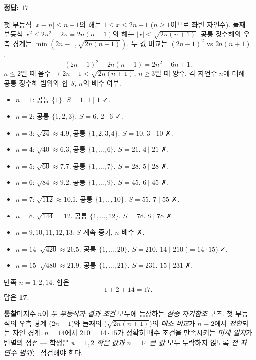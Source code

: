 \documentclass[10pt]{article}
\newcommand{\solnote}[1]{\par\smallskip\noindent
  \begin{tcolorbox}[enhanced, breakable, colback=vB-light, colframe=vB-light,
    boxrule=0pt, arc=3pt, left=10pt, right=10pt, top=4pt, bottom=4pt,
    fontupper=\sffamily\footnotesize\color{vB-ink}]
    \textbf{\color{vB-deep}통찰}\quad #1
  \end{tcolorbox}}
\begin{document}
\begin{answerbox}\sffamily\bfseries 정답: $17$\end{answerbox}
 첫 부등식 $|x - n| \le n - 1$의 해는 $1 \le x \le 2n - 1$ ($n \ge 1$이므로 좌변 자연수).
 둘째 부등식 $x^2 \le 2n^2 + 2n = 2n(n + 1)$의 해는 $|x| \le \sqrt{2n(n + 1)}$.
 공통 정수해의 우측 경계는 $\min(2n - 1, \sqrt{2n(n + 1)})$. 두 값 비교는 $(2n - 1)^2$ vs $2n(n + 1)$.
\[ (2n - 1)^2 - 2n(n + 1) = 2n^2 - 6n + 1. \]
$n \le 2$일 때 음수 → $2n - 1 < \sqrt{2n(n+1)}$, $n \ge 3$일 때 양수.
 각 자연수 $n$에 대해 공통 정수해 범위와 합 $S$, $n$의 배수 여부.
\begin{itemize}\setlength{\itemsep}{0pt}
\item $n = 1$: 공통 $\{1\}$. $S = 1$. $1 \mid 1$ ✓.
\item $n = 2$: 공통 $\{1, 2, 3\}$. $S = 6$. $2 \mid 6$ ✓.
\item $n = 3$: $\sqrt{24} \approx 4.9$, 공통 $\{1, 2, 3, 4\}$. $S = 10$. $3 \mid 10$ ✗.
\item $n = 4$: $\sqrt{40} \approx 6.3$, 공통 $\{1, \ldots, 6\}$. $S = 21$. $4 \mid 21$ ✗.
\item $n = 5$: $\sqrt{60} \approx 7.7$. 공통 $\{1, \ldots, 7\}$. $S = 28$. $5 \mid 28$ ✗.
\item $n = 6$: $\sqrt{84} \approx 9.2$. 공통 $\{1, \ldots, 9\}$. $S = 45$. $6 \mid 45$ ✗.
\item $n = 7$: $\sqrt{112} \approx 10.6$. 공통 $\{1, \ldots, 10\}$. $S = 55$. $7 \mid 55$ ✗.
\item $n = 8$: $\sqrt{144} = 12$. 공통 $\{1, \ldots, 12\}$. $S = 78$. $8 \mid 78$ ✗.
\item $n = 9, 10, 11, 12, 13$: $S$ 계속 증가, $n$ 배수 ✗.
\item $n = 14$: $\sqrt{420} \approx 20.5$. 공통 $\{1, \ldots, 20\}$. $S = 210$. $14 \mid 210$ ($= 14 \cdot 15$) ✓.
\item $n = 15$: $\sqrt{480} \approx 21.9$. 공통 $\{1, \ldots, 21\}$. $S = 231$. $15 \mid 231$ ✗.
\end{itemize}
 만족 $n = 1, 2, 14$. 합은
\[ 1 + 2 + 14 = 17. \]
답은 $\textbf{17}$.
\solnote{미지수 $n$이 \emph{두 부등식과 결과 조건} 모두에 등장하는 \emph{삼중 자기참조} 구조. 첫 부등식의 우측 경계 ($2n - 1$)와 둘째의 ($\sqrt{2n(n+1)}$)의 \emph{대소 비교}가 $n = 2$에서 \emph{전환}되는 자연 경계. $n = 14$에서 \emph{$210 = 14 \cdot 15$}가 정확히 배수 조건을 만족시키는 \emph{미세 일치}가 변별의 정점 — 학생은 \emph{$n = 1, 2$ 작은 값과 $n = 14$ 큰 값} 모두 누락하지 않도록 \emph{전 자연수 범위}를 점검해야 한다.}
\end{document}
